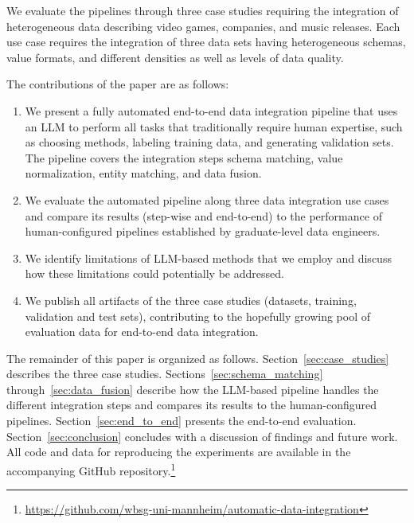 We evaluate the pipelines through three case studies requiring the integration of heterogeneous data describing video games, companies, and music releases. Each use case requires the integration of three data sets having heterogeneous schemas, value formats, and different densities as well as levels of data quality.



The contributions of the paper are as follows:

\begin{enumerate}
    \item We present a fully automated end-to-end data integration pipeline that uses an LLM to perform all tasks that traditionally require human expertise, such as choosing methods, labeling training data, and generating validation sets. The pipeline covers the integration steps schema matching, value normalization, entity matching, and data fusion.

    \item We evaluate the automated pipeline along three data integration use cases and compare its results (step-wise and end-to-end) to the performance of human-configured pipelines established by graduate-level data engineers.

    \item We identify limitations of LLM-based methods that we employ and discuss how these limitations could potentially be addressed.

    \item We publish all artifacts of the three case studies (datasets, training, validation and test sets), contributing to the hopefully growing pool of evaluation data for end-to-end data integration. 
\end{enumerate}

The remainder of this paper is organized as follows. Section~\ref{sec:case_studies} describes the three case studies. Sections~\ref{sec:schema_matching} through~\ref{sec:data_fusion} describe how the LLM-based pipeline handles the different integration steps and compares its results to the human-configured pipelines. Section~\ref{sec:end_to_end} presents the end-to-end evaluation. Section~\ref{sec:conclusion} concludes with a discussion of findings and future work. All code and data for reproducing the experiments are available in the accompanying GitHub repository.\footnote{\url{https://github.com/wbsg-uni-mannheim/automatic-data-integration}}
